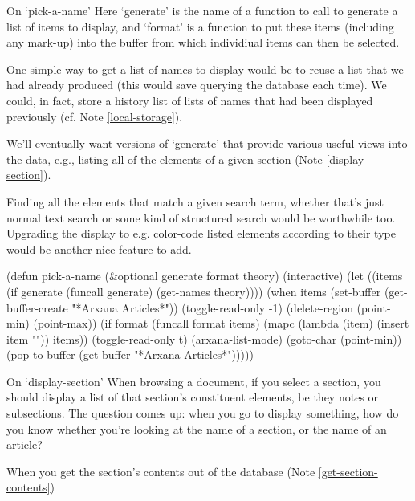 \begin{notate}{On `pick-a-name'} \label{pick-a-name}
Here `generate' is the name of a function to call to
generate a list of items to display, and `format' is a
function to put these items (including any mark-up) into
the buffer from which individiual items can then be
selected.

One simple way to get a list of names to display would be
to reuse a list that we had already produced (this would
save querying the database each time).  We could, in fact,
store a history list of lists of names that had been
displayed previously (cf. Note \ref{local-storage}).

We'll eventually want versions of `generate' that provide
various useful views into the data, e.g., listing all of
the elements of a given section (Note
\ref{display-section}).

Finding all the elements that match a given search term,
whether that's just normal text search or some kind of
structured search would be worthwhile too.  Upgrading the
display to e.g. color-code listed elements according to
their type would be another nice feature to add.
\end{notate}

\begin{elisp}
(defun pick-a-name (&optional generate format theory)
  (interactive)
  (let ((items (if generate
                   (funcall generate)
                 (get-names theory))))
    (when items
      (set-buffer (get-buffer-create "*Arxana Articles*"))
      (toggle-read-only -1)
      (delete-region (point-min)
                     (point-max))
      (if format
          (funcall format items)
        (mapc (lambda (item) (insert item "\n")) items))
      (toggle-read-only t)
      (arxana-list-mode)
      (goto-char (point-min))
      (pop-to-buffer (get-buffer "*Arxana Articles*")))))
\end{elisp}

\begin{notate}{On `display-section'} \label{display-section}
When browsing a document, if you select a section, you
should display a list of that section's constituent
elements, be they notes or subsections.  The question
comes up: when you go to display something, how do you
know whether you're looking at the name of a section, or
the name of an article?

When you get the section's contents out of the database
(Note \ref{get-section-contents})
\end{notate}

